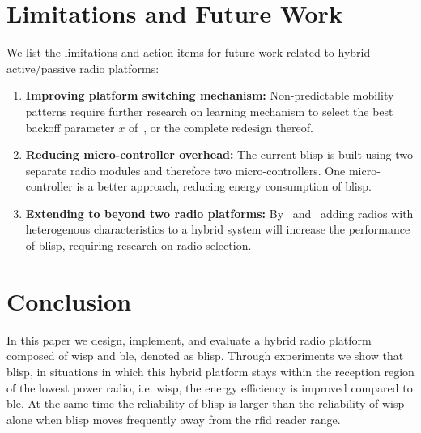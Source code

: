 \documentclass[conference,letterpaper,twoside,final,10pt]{IEEEtran}
\newcommand{\acresetwithnoexpand}{\acresetall
	\acused{gsm}
	\acused{rfid}
	\acused{rf}
	\acused{rn16}
}
\begin{document}
\section{Limitations and Future Work}
\label{sec:future}

We list the limitations and action items for future work related to hybrid active/passive radio platforms:

\begin{enumerate}
	\item 	\textbf{Improving platform switching mechanism:} Non-predictable mobility patterns require further research on learning mechanism to select the best backoff parameter $x$ of~, or the complete redesign thereof.
	\item 	\textbf{Reducing micro-controller overhead:} The current \ac{blisp} is built using two separate radio modules and therefore two micro-controllers.
One micro-controller is a better approach, reducing energy consumption of \ac{blisp}.
	\item 	\textbf{Extending to beyond two radio platforms:} 
By~ and~ adding radios with heterogenous characteristics to a hybrid system will increase the performance of \ac{blisp}, requiring research on radio selection.
\end{enumerate}

\acresetwithnoexpand

\section{Conclusion}
\label{sec:conclusions}

In this paper we design, implement, and evaluate a hybrid radio platform composed of \acf{wisp} and \acf{ble}, denoted as \acs{blisp}.
Through experiments we show that \acs{blisp}, in situations in which this hybrid platform stays within the reception region of the lowest power radio, i.e. \ac{wisp}, the energy efficiency is improved compared to \ac{ble}. At the same time the reliability of \acs{blisp} is larger than the reliability of \ac{wisp} alone when \acs{blisp} moves frequently away from the \ac{rfid} reader range.
\end{document}
